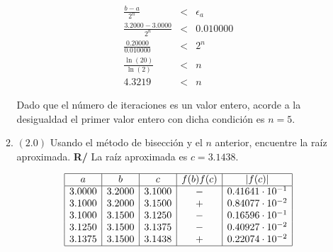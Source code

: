 \documentclass[12pt]{article}
\begin{document}
\begin{enumerate}[leftmargin=*,widest=9]
\begin{enumerate}[label=\alph*]
   \begin{eqnarray*}
   \frac{b - a}{2^n} &<& \epsilon_a \\
   \frac{3.2000 - 3.0000}{2^n} &<& 0.010000 \\
   \frac{0.20000}{0.010000} &<& 2^n \\
   \frac{\ln(20)}{\ln(2)} &<& n \\
   4.3219 &<& n
   \end{eqnarray*}
   
   Dado que el número de iteraciones es un valor entero, acorde a la desigualdad el primer valor entero con dicha condición es \(n=5\).
   \item \((2.0)\) Usando el método de bisección y el \(n\) anterior, encuentre la raíz aproximada.
\textbf{R/} La raíz aproximada es \(c = 3.1438 \).
 
\begin{equation*}
     \begin{array}{|c|c|c|c|c|}
   \hline
   a & b & c & f(b)f(c) & |f(c)| \\
   \hline
   3.0000 & 3.2000 & 3.1000 & - & 0.41641 \cdot 10^{-1} \\
   3.1000 & 3.2000 & 3.1500 & + & 0.84077 \cdot 10^{-2} \\
   3.1000 & 3.1500 & 3.1250 & - & 0.16596 \cdot 10^{-1} \\
   3.1250 & 3.1500 & 3.1375 & - & 0.40927 \cdot 10^{-2} \\
   3.1375 & 3.1500 & 3.1438 & + & 0.22074 \cdot 10^{-2} \\
   \hline
   \end{array}
\end{equation*}   
    \end{enumerate}
    
  \end{enumerate}
\end{document}
